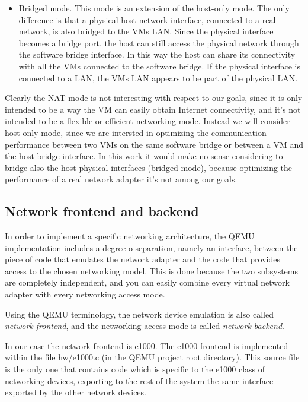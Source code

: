 \begin{itemize}
    \item Bridged mode. This mode is an extension of the host-only mode. The only difference is that a physical host network interface,
	  connected to a real network, is also bridged to the VMs LAN. Since the physical interface becomes a bridge port, the host can
	  still access the physical network through the software bridge interface.
	  In this way the host can share its connectivity with all the VMs connected to the software bridge. If the physical interface
	  is connected to a LAN, the VMs LAN appears to be part of the physical LAN.
	  
\end{itemize}
	
Clearly the NAT mode is not interesting with respect to our goals, since it is only intended to be a way the VM can easily obtain
Internet connectivity, and it's not intended to be a flexible or efficient networking mode. Instead we will consider host-only mode, since
we are intersted in optimizing the communication performance between two VMs on the same software bridge or between a VM and the host
bridge interface. In this work it would make no sense considering to bridge also the host physical interfaces (bridged mode), 
because optimizing the performance of a real network adapter it's not among our goals.


\subsection{Network frontend and backend}
\label{sec:frontback}
In order to implement a specific networking architecture, the QEMU implementation includes a degree o separation, namely an interface,
between the piece of code that emulates the network adapter and the code that provides access to the chosen networking model.
This is done because the two subsystems are completely independent, and you can easily combine every virtual network adapter with
every networking access mode.

Using the QEMU terminology, the network device emulation is also called \emph{network frontend}, and the networking access mode is
called \emph{network backend}. 

\vspace{0.5cm}

In our case the network frontend is e1000. The e1000 frontend is implemented within the file hw/e1000.c (in the QEMU project root directory).
This source file is the only one that contains code which is specific to the e1000 class of networking devices, exporting to the rest 
of the system the same interface exported by the other network devices.

